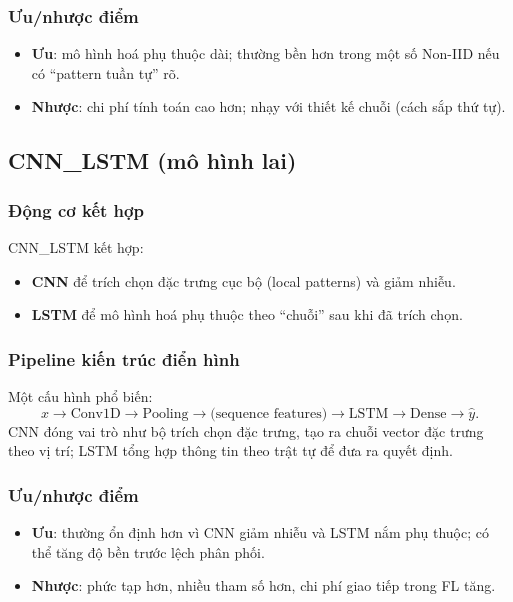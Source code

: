 \documentclass[12pt,a4paper]{article}
\begin{document}
\subsubsection{Ưu/nhược điểm}
\begin{itemize}
    \item \textbf{Ưu}: mô hình hoá phụ thuộc dài; thường bền hơn trong một số Non-IID nếu có ``pattern tuần tự'' rõ.
    \item \textbf{Nhược}: chi phí tính toán cao hơn; nhạy với thiết kế chuỗi (cách sắp thứ tự).
\end{itemize}

\subsection{CNN\_LSTM (mô hình lai)}

\subsubsection{Động cơ kết hợp}
CNN\_LSTM kết hợp:
\begin{itemize}
    \item \textbf{CNN} để trích chọn đặc trưng cục bộ (local patterns) và giảm nhiễu.
    \item \textbf{LSTM} để mô hình hoá phụ thuộc theo ``chuỗi'' sau khi đã trích chọn.
\end{itemize}

\subsubsection{Pipeline kiến trúc điển hình}
Một cấu hình phổ biến:
\[
x \rightarrow \text{Conv1D} \rightarrow \text{Pooling} \rightarrow \text{(sequence features)} \rightarrow \text{LSTM} \rightarrow \text{Dense} \rightarrow \hat y.
\]
CNN đóng vai trò như bộ trích chọn đặc trưng, tạo ra chuỗi vector đặc trưng theo vị trí; LSTM tổng hợp thông tin theo trật tự để đưa ra quyết định.

\subsubsection{Ưu/nhược điểm}
\begin{itemize}
    \item \textbf{Ưu}: thường ổn định hơn vì CNN giảm nhiễu và LSTM nắm phụ thuộc; có thể tăng độ bền trước lệch phân phối.
    \item \textbf{Nhược}: phức tạp hơn, nhiều tham số hơn, chi phí giao tiếp trong FL tăng.
\end{itemize}
\end{document}
